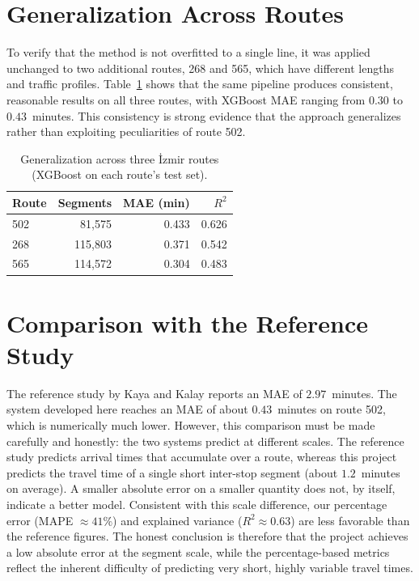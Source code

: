 \section{Generalization Across Routes}

To verify that the method is not overfitted to a single line, it was applied unchanged to two additional routes, 268 and 565, which have different lengths and traffic profiles. Table~\ref{tab:multiroute} shows that the same pipeline produces consistent, reasonable results on all three routes, with XGBoost MAE ranging from $0.30$ to $0.43$~minutes. This consistency is strong evidence that the approach generalizes rather than exploiting peculiarities of route 502.

\begin{table}[!htbp]
    \centering
    \caption{\label{tab:multiroute}Generalization across three İzmir routes (XGBoost on each route's test set).}
    \begin{tabular}{@{}lrrr@{}}
        \toprule
        \textbf{Route} & \textbf{Segments} & \textbf{MAE (min)} & \textbf{$R^2$} \\
        \midrule
        502 & 81{,}575  & 0.433 & 0.626 \\
        268 & 115{,}803 & 0.371 & 0.542 \\
        565 & 114{,}572 & 0.304 & 0.483 \\
        \bottomrule
    \end{tabular}
\end{table}

\section{Comparison with the Reference Study}

The reference study by Kaya and Kalay \cite{kaya2025} reports an MAE of $2.97$~minutes. The system developed here reaches an MAE of about $0.43$~minutes on route 502, which is numerically much lower. However, this comparison must be made carefully and honestly: the two systems predict at different scales. The reference study predicts arrival times that accumulate over a route, whereas this project predicts the travel time of a single short inter-stop segment (about $1.2$~minutes on average). A smaller absolute error on a smaller quantity does not, by itself, indicate a better model. Consistent with this scale difference, our percentage error (MAPE $\approx 41\%$) and explained variance ($R^2 \approx 0.63$) are less favorable than the reference figures. The honest conclusion is therefore that the project achieves a low absolute error at the segment scale, while the percentage-based metrics reflect the inherent difficulty of predicting very short, highly variable travel times.

